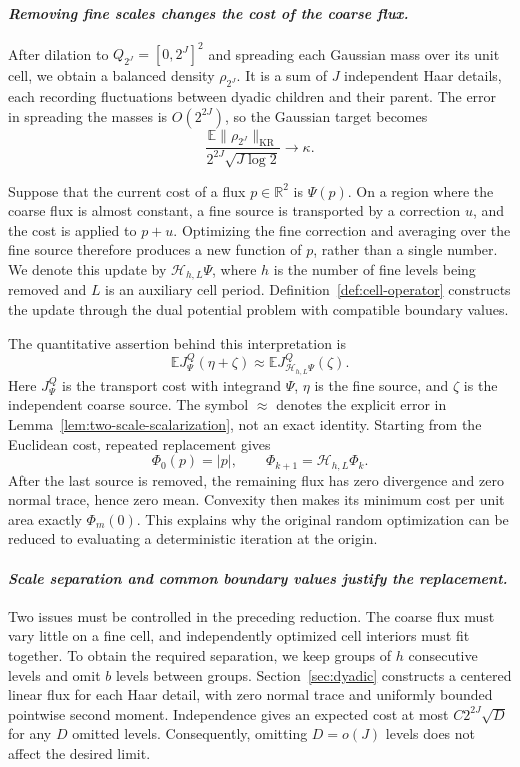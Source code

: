 \documentclass{smfart}
\theoremstyle{definition}
\newcommand{\1}{\mathbf 1}
\newcommand{\KR}{\mathrm{KR}}
\begin{document}
\smallskip
\paragraph{\textit{Removing fine scales changes the cost of the coarse flux.}}
After dilation to $Q_{2^J}=[0,2^J]^2$ and spreading each Gaussian mass
over its unit cell, we obtain a balanced density $\rho_{2^J}$.
It is a sum of $J$ independent Haar details, each recording fluctuations
between dyadic children and their parent.  The error in spreading the
masses is $O(2^{2J})$, so the Gaussian target becomes
\[
\frac{\mathbb E\|\rho_{2^J}\|_{\KR}}{2^{2J}\sqrt{J\log2}}
\longrightarrow\kappa.
\]

Suppose that the current cost of a flux $p\in\mathbb R^2$ is $\Psi(p)$.
On a region where the coarse flux is almost constant, a fine source is
transported by a correction $u$, and the cost is applied to $p+u$.
Optimizing the fine correction and averaging over the fine source
therefore produces a new function of $p$, rather than a single number.
We denote this update by $\mathcal H_{h,L}\Psi$, where $h$ is the number
of fine levels being removed and $L$ is an auxiliary cell period.
Definition~\ref{def:cell-operator} constructs the update through the dual
potential problem with compatible boundary values.

The quantitative assertion behind this interpretation is
\[
\mathbb E J_\Psi^Q(\eta+\zeta)
\approx\mathbb E J_{\mathcal H_{h,L}\Psi}^Q(\zeta).
\]
Here $J_\Psi^Q$ is the transport cost with integrand $\Psi$, $\eta$ is the
fine source, and $\zeta$ is the independent coarse source.  The symbol
$\approx$ denotes the explicit error in
Lemma~\ref{lem:two-scale-scalarization}, not an exact identity.
Starting from the Euclidean cost, repeated replacement gives
\[
\Phi_0(p)=|p|,\qquad \Phi_{k+1}=\mathcal H_{h,L}\Phi_k.
\]
After the last source is removed, the remaining flux has zero divergence
and zero normal trace, hence zero mean.  Convexity then makes its minimum
cost per unit area exactly $\Phi_m(0)$.  This explains why the original
random optimization can be reduced to evaluating a deterministic
iteration at the origin.

\smallskip
\paragraph{\textit{Scale separation and common boundary values justify the replacement.}}
Two issues must be controlled in the preceding reduction.  The coarse
flux must vary little on a fine cell, and independently optimized cell
interiors must fit together.  To obtain the required separation, we keep
groups of $h$ consecutive levels and omit $b$ levels between groups.
Section~\ref{sec:dyadic} constructs a centered linear flux for each Haar
detail, with zero normal trace and uniformly bounded pointwise second
moment.  Independence gives an expected cost at most
$C2^{2J}\sqrt D$ for any $D$ omitted levels.  Consequently, omitting
$D=o(J)$ levels does not affect the desired limit.
\end{document}

